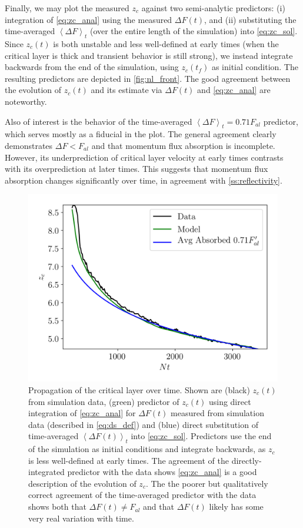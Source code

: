 \documentclass[
        fleqn,
        usenatbib,
    ]{mnras}
\newcommand*{\ev}[1]{\left\langle#1\right\rangle}
\begin{document}
Finally, we may plot the measured $z_c$ against two semi-analytic predictors:
(i) integration of \autoref{eq:zc_anal} using the measured $\Delta F(t)$, and
(ii) substituting the time-averaged $\ev{\Delta F}_t$ (over the entire length of
the simulation) into \autoref{eq:zc_sol}. Since $z_c(t)$ is both unstable and
less well-defined at early times (when the critical layer is thick and transient
behavior is still strong), we instead integrate backwards from the end of the
simulation, using $z_c(t_f)$ as initial condition. The resulting predictors are
depicted in \autoref{fig:nl_front}. The good agreement between the evolution of
$z_c(t)$ and its estimate via $\Delta F(t)$ and \autoref{eq:zc_anal} are
noteworthy.

Also of interest is the behavior of the time-averaged $\ev{\Delta F}_t =
0.71F_{al}$ predictor, which serves mostly as a fiducial in the plot. The
general agreement clearly demonstrates $\Delta F < F_{al}$ and that momentum
flux absorption is incomplete. However, its underprediction of critical layer
velocity at early times contrasts with its overprediction at later times. This
suggests that momentum flux absorption changes significantly over time, in
agreement with \autoref{ss:reflectivity}.

\begin{figure}
    \centering
    \includegraphics[width=\columnwidth]{plots/nl_front.png}
    \caption{Propagation of the critical layer over time. Shown are (black)
    $z_c(t)$ from simulation data, (green) predictor of $z_c(t)$ using direct
    integration of \autoref{eq:zc_anal} for $\Delta F(t)$ measured from
    simulation data (described in \autoref{eq:ds_def}) and (blue) direct
    substitution of time-averaged $\ev{\Delta F(t)}_t$ into
    \autoref{eq:zc_sol}. Predictors use the end of the simulation as initial
    conditions and integrate backwards, as $z_c$ is less well-defined at early
    times. The agreement of the directly-integrated predictor with the data
    shows \autoref{eq:zc_anal} is a good description of the evolution of $z_c$.
    The the poorer but qualitatively correct agreement of the time-averaged
    predictor with the data shows both that $\Delta F(t) \neq F_{al}$ and that
    $\Delta F(t)$ likely has some very real variation with
    time.}\label{fig:nl_front}
\end{figure}
\end{document}
